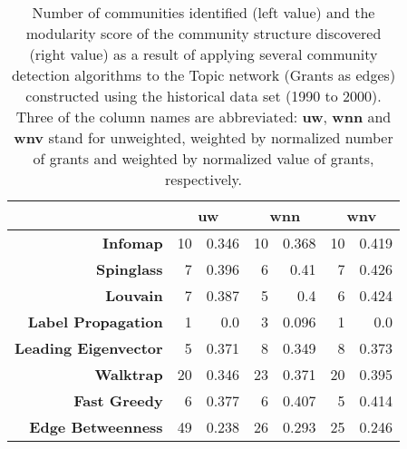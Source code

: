 \begin{table}[!htbp]
\centering
\caption[Number of communities and modularity score of community structure identified within the Topic network (Grants as edges) constructed using the historical data set (1990 to 2000)]{Number of communities identified (left value) and the modularity score of the community structure discovered (right value) as a result of applying several community detection algorithms to the Topic network (Grants as edges) constructed using the historical data set (1990 to 2000). Three of the column names are abbreviated: \textbf{uw}, \textbf{wnn} and \textbf{wnv} stand for unweighted, weighted by normalized number of grants and weighted by normalized value of grants, respectively.}
\label{table:topic_a_historical2_modularity_appendix}
\begin{tabular}{r|rr|rr|rr}
\textbf{} & \multicolumn{2}{c|}{\textbf{uw}} & \multicolumn{2}{c|}{\textbf{wnn}} & \multicolumn{2}{c}{\textbf{wnv}}\\
\hline
\textbf{Infomap}             & {10} & {0.346} & {10} & {0.368} & {10} & {0.419}\\
\textbf{Spinglass}           & {7}  & {0.396} & {6}  & {0.41}  & {7}  & {0.426}\\
\textbf{Louvain}             & {7}  & {0.387} & {5}  & {0.4}   & {6}  & {0.424}\\
\textbf{Label Propagation}   & {1}  & {0.0}   & {3}  & {0.096} & {1}  & {0.0}\\
\textbf{Leading Eigenvector} & {5}  & {0.371} & {8}  & {0.349} & {8}  & {0.373}\\
\textbf{Walktrap}            & {20} & {0.346} & {23} & {0.371} & {20} & {0.395}\\
\textbf{Fast Greedy}         & {6}  & {0.377} & {6}  & {0.407} & {5}  & {0.414}\\
\textbf{Edge Betweenness}    & {49} & {0.238} & {26} & {0.293} & {25} & {0.246}
\end{tabular}
\end{table}

